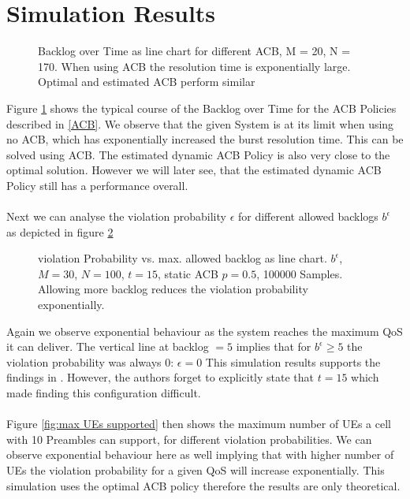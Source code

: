 \documentclass[conference]{IEEEtran}
\begin{document}
\section{Simulation Results}
\begin{figure}
\resizebox{\columnwidth}{!}{}
    \caption{Backlog over Time as line chart for different ACB, M = 20, N = 170. When using ACB the resolution time is exponentially large. Optimal and estimated ACB perform similar}\label{fig:backlog}
\end{figure}
Figure \ref{fig:backlog} shows the typical course of the Backlog over Time for the ACB Policies described in \ref{ACB}.
We observe that the given System is at its limit when using no ACB, which has exponentially increased the burst resolution time.
This can be solved using ACB. The estimated dynamic ACB Policy is also very close to the optimal solution. However we will later see, that the estimated dynamic ACB Policy still has a performance overall.\\\\
Next we can analyse the violation probability $\epsilon$ for different allowed backlogs $b^\epsilon$ as depicted in figure \ref{fig:violation prob}
\begin{figure}
\resizebox{\columnwidth}{!}{}
    \caption{violation Probability vs. max. allowed backlog as line chart. $b^\epsilon$,  $M = 30$, $N = 100$, $t = 15$, static ACB $p=0.5$, 100000 Samples.\\Allowing more backlog reduces the violation probability exponentially.}\label{fig:violation prob}
\end{figure}
Again we observe exponential behaviour as the system reaches the maximum QoS it can deliver.
The vertical line at backlog $= 5$ implies that for $b^\epsilon\geq 5$ the violation probability was always 0: $\epsilon = 0$
This simulation results supports the findings in \cite{8422323}.
However, the authors forget to explicitly state that $t = 15$ which made finding this configuration difficult.\\\\
Figure \ref{fig:max UEs supported} then shows the maximum number of UEs a cell with 10 Preambles can support, for different violation probabilities.
We can observe exponential behaviour here as well implying that with higher number of UEs the violation probability for a given QoS will increase exponentially.
This simulation uses the optimal ACB policy therefore the results are only theoretical.\\\\
\end{document}
